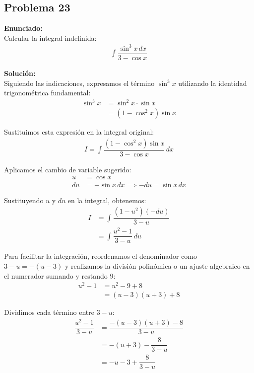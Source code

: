 \subsection*{Problema 23}

\textbf{Enunciado:} \\
Calcular la integral indefinida:
\begin{align*}
\int \dfrac{\sin^3 x \, dx}{3 - \cos x}
\end{align*}

\textbf{Solución:} \\
Siguiendo las indicaciones, expresamos el término $\sin^3 x$ utilizando la identidad trigonométrica fundamental:
\begin{align*}
\sin^3 x &= \sin^2 x \cdot \sin x \\
&= (1 - \cos^2 x)\sin x
\end{align*}

Sustituimos esta expresión en la integral original:
\begin{align*}
I = \int \dfrac{(1 - \cos^2 x)\sin x}{3 - \cos x} \, dx
\end{align*}

Aplicamos el cambio de variable sugerido:
\begin{align*}
u &= \cos x \\
du &= -\sin x \, dx \implies -du = \sin x \, dx
\end{align*}

Sustituyendo $u$ y $du$ en la integral, obtenemos:
\begin{align*}
I &= \int \dfrac{(1 - u^2)(-du)}{3 - u} \\
&= \int \dfrac{u^2 - 1}{3 - u} \, du
\end{align*}

Para facilitar la integración, reordenamos el denominador como $3 - u = -(u - 3)$ y realizamos la división polinómica o un ajuste algebraico en el numerador sumando y restando $9$:
\begin{align*}
u^2 - 1 &= u^2 - 9 + 8 \\
&= (u - 3)(u + 3) + 8
\end{align*}

Dividimos cada término entre $3 - u$:
\begin{align*}
\dfrac{u^2 - 1}{3 - u} &= \dfrac{-(u - 3)(u + 3) - 8}{3 - u} \\
&= -(u + 3) - \dfrac{8}{3 - u} \\
&= -u - 3 + \dfrac{8}{3 - u}
\end{align*}

